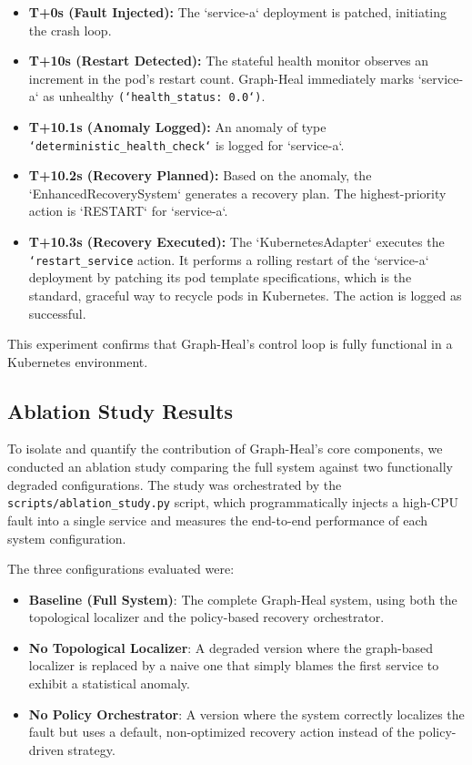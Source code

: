 \documentclass[11pt,conference]{IEEEtran}
\begin{document}
\begin{itemize}
    \item \textbf{T+0s (Fault Injected):} The `service-a` deployment is patched, initiating the crash loop.
    \item \textbf{T+10s (Restart Detected):} The stateful health monitor observes an increment in the pod's restart count. Graph-Heal immediately marks `service-a` as unhealthy \texttt{(`health\_status: 0.0`)}.
    \item \textbf{T+10.1s (Anomaly Logged):} An anomaly of type \texttt{`deterministic\_health\_check`} is logged for `service-a`.
    \item \textbf{T+10.2s (Recovery Planned):} Based on the anomaly, the `EnhancedRecoverySystem` generates a recovery plan. The highest-priority action is `RESTART` for `service-a`.
    \item \textbf{T+10.3s (Recovery Executed):} The `KubernetesAdapter` executes the \texttt{`restart\_service} action. It performs a rolling restart of the `service-a` deployment by patching its pod template specifications, which is the standard, graceful way to recycle pods in Kubernetes. The action is logged as successful.
\end{itemize}

This experiment confirms that Graph-Heal's control loop is fully functional in a Kubernetes environment.

\subsection{Ablation Study Results}
To isolate and quantify the contribution of Graph-Heal's core components, we conducted an ablation study comparing the full system against two functionally degraded configurations. The study was orchestrated by the \texttt{scripts/ablation\_study.py} script, which programmatically injects a high-CPU fault into a single service and measures the end-to-end performance of each system configuration.

The three configurations evaluated were:
\begin{itemize}
    \item \textbf{Baseline (Full System)}: The complete Graph-Heal system, using both the topological localizer and the policy-based recovery orchestrator.
    \item \textbf{No Topological Localizer}: A degraded version where the graph-based localizer is replaced by a naive one that simply blames the first service to exhibit a statistical anomaly.
    \item \textbf{No Policy Orchestrator}: A version where the system correctly localizes the fault but uses a default, non-optimized recovery action instead of the policy-driven strategy.
\end{itemize}
\end{document}
